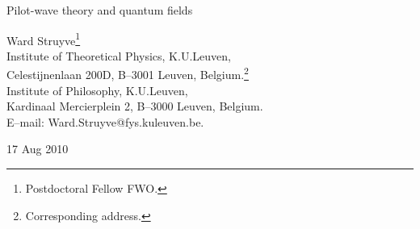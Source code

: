 \documentclass[12pt]{article}
\begin{document}
\vspace*{1.0cm}
\noindent
{\bf
{\large
\begin{center}
Pilot-wave theory and quantum fields
\end{center}
}
}

\vspace*{.5cm}
\begin{center}
Ward Struyve{\footnote{Postdoctoral Fellow FWO.}}\\
Institute of Theoretical Physics, K.U.Leuven,\\
Celestijnenlaan 200D, B--3001 Leuven, Belgium.{\footnote{Corresponding address.}}\\
Institute of Philosophy, K.U.Leuven,\\
Kardinaal Mercierplein 2, B--3000 Leuven, Belgium.\\
E--mail: Ward.Struyve@fys.kuleuven.be.
\end{center}

\begin{center}
17 Aug 2010
\end{center}

\begin{abstract}
\noindent
Pilot-wave theories provide possible solutions to the measurement problem. In such theories, quantum systems are not only described by the state vector, but also by some additional variables. These additional variables, also called beables, can be particle positions, field configurations, strings, etc. In this paper we focus our attention on pilot-wave theories in which the additional variables are field configurations. The first such theory was proposed by Bohm for the free electromagnetic field. Since Bohm, similar pilot-wave theories have been proposed for other quantum fields. The purpose of this paper is to present an overview and further development of these proposals. We discuss various bosonic quantum field theories such as the Schr{\"o}\-ding\-er field, the free electromagnetic field, scalar quantum electrodynamics and the Abelian Higgs model. In particular, we compare the pilot-wave theories proposed by Bohm and by Valentini for the electromagnetic field, finding that they are equivalent. We further discuss the proposals for fermionic fields by Holland and Valentini. In the case of Holland's model we indicate that further work is required in order to show that the model is capable of reproducing the standard quantum predictions. We also consider a similar model, which does not seem to reproduce the standard quantum predictions. In the case of Valentini's model we point out a problem that seems hard to overcome.
\end{abstract}
\end{document}
